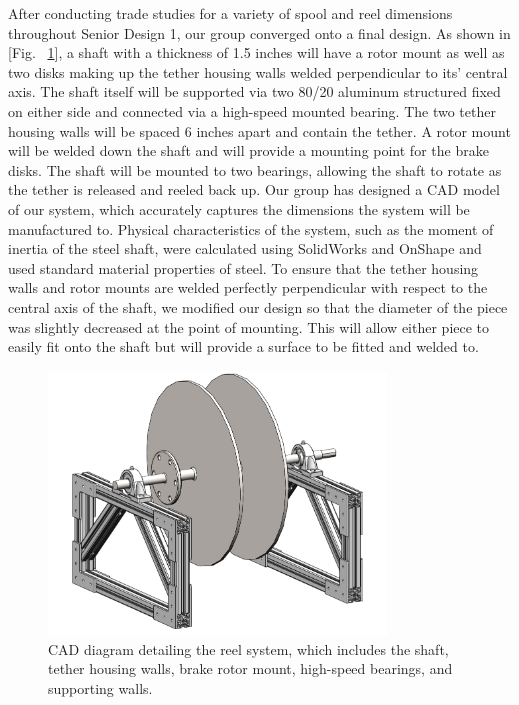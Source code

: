 \indent\indent After conducting trade studies for a variety of spool and reel dimensions throughout Senior Design 1, our group converged onto a final design. As shown in [Fig. ~\ref{fig:TUMBRSpoolFrame}], a shaft with a thickness of 1.5 inches will have a rotor mount as well as two disks making up the tether housing walls welded perpendicular to its' central axis. The shaft itself will be supported via two 80/20 aluminum structured fixed on either side and connected via a high-speed mounted bearing. The two tether housing walls will be spaced 6 inches apart and contain the tether. A rotor mount will be welded down the shaft and will provide a mounting point for the brake disks. The shaft will be mounted to two bearings, allowing the shaft to rotate as the tether is released and reeled back up. Our group has designed a CAD model of our system, which accurately captures the dimensions the system will be manufactured to. Physical characteristics of the system, such as the moment of inertia of the steel shaft, were calculated using SolidWorks and OnShape and used standard material properties of steel. To ensure that the tether housing walls and rotor mounts are welded perfectly perpendicular with respect to the central axis of the shaft, we modified our design so that the diameter of the piece was slightly decreased at the point of mounting. This will allow either piece to easily fit onto the shaft but will provide a surface to be fitted and welded to.

\begin{figure}[ht]
 \centering
 \includegraphics[width=0.8\textwidth]{TUMBR/SpoolFrame.PNG}
 \caption{\label{fig:TUMBRSpoolFrame} CAD diagram detailing the reel system, which includes the shaft, tether housing walls, brake rotor mount, high-speed bearings, and supporting walls.}
\end{figure}

